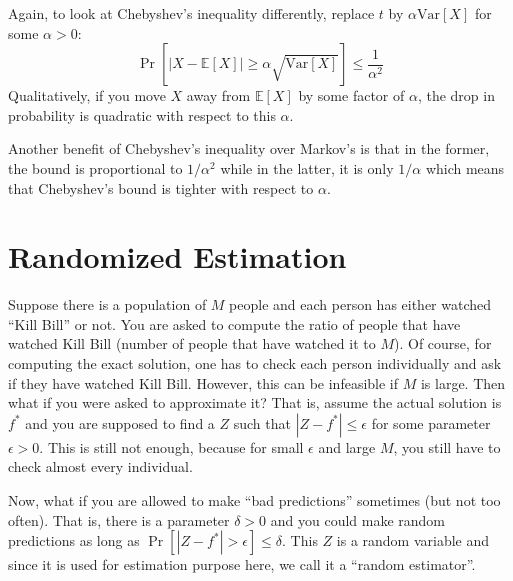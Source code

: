 \documentclass[11pt]{article}
\newcommand{\Ex}{\mathbb{E}}
\newcommand{\Var}{\text{Var}}
\begin{document}
Again, to look at Chebyshev's inequality differently, replace $t$ by $\alpha \Var[X]$ for some $\alpha > 0$:
\begin{equation*}
    \Pr[|X - \Ex[X]| \geq \alpha \sqrt{\Var[X]}] \leq \frac{1}{\alpha^2}
\end{equation*}
Qualitatively, if you move $X$ away from $\Ex[X]$ by some factor of $\alpha$, the drop in probability is quadratic with respect to this $\alpha$.

Another benefit of Chebyshev's inequality over Markov's is that in the former, the bound is proportional to $1/\alpha^2$ while in the latter, it is only $1/\alpha$ which means that Chebyshev's bound is tighter with respect to $\alpha$.

\section{Randomized Estimation}
Suppose there is a population of $M$ people and each person has either watched ``Kill Bill'' or not. You are asked to compute the ratio of people that have watched Kill Bill (number of people that have watched it to $M$). Of course, for computing the exact solution, one has to check each person individually and ask if they have watched Kill Bill. However, this can be infeasible if $M$ is large. Then what if you were asked to approximate it? That is, assume the actual solution is $f^*$ and you are supposed to find a $Z$ such that $|Z - f^*| \leq \epsilon$ for some parameter $\epsilon > 0$. This is still not enough, because for small $\epsilon$ and large $M$, you still have to check almost every individual.

Now, what if you are allowed to make ``bad predictions'' sometimes (but not too often). That is, there is a parameter $\delta > 0$ and you could make random predictions as long as $\Pr[|Z - f^*| > \epsilon] \leq \delta$. This $Z$ is a random variable and since it is used for estimation purpose here, we call it a ``random estimator''.
\end{document}
